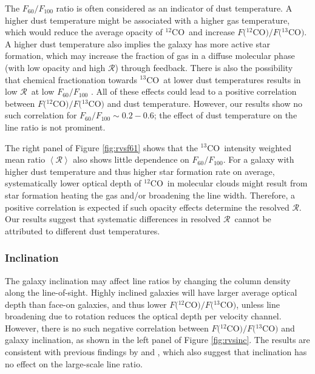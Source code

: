 \documentclass{emulateapj}
\def\ttco{\mbox{$^{13}$CO}}
\def\twco{\mbox{$^{12}$CO}}
\def\rtt{$\mathcal{R}$}
\begin{document}
The $F_{60}/F_{100}$ ratio is often considered as an indicator of
dust temperature. A higher dust temperature might be associated 
with a higher gas temperature, which would reduce the average opacity of \twco \ and increase  $F($\twco$)/F($\ttco$)$.  
A higher dust temperature also implies the galaxy has more active star formation, which may increase the fraction 
of gas in a diffuse molecular phase 
(with low opacity and high \rtt) through feedback. 
There is also the possibility that chemical fractionation
towards \ttco \ at lower dust temperatures results in
low \rtt \ at low $F_{60}/F_{100}$ \citep{Crocker2012}. 
All of these effects could lead to a positive correlation between  
$F($\twco$)/F($\ttco$)$ and dust temperature.  
However, our results show no such correlation for  $F_{60}/F_{100} \sim 0.2 - 0.6$; 
the effect of dust temperature on the line ratio is not prominent.  

The right panel of Figure \ref{fig:rvsf61} shows that 
the \ttco \ intensity weighted mean ratio 
$\left<\mathcal{R}\right>$ also shows little dependence on $F_{60}/F_{100}$.  
For a galaxy with higher dust temperature and thus higher star formation rate on average, 
systematically lower optical depth of \twco \ in molecular clouds might result from 
star formation heating the gas and/or broadening the line width. 
Therefore, a positive correlation is expected if such opacity effects 
determine the resolved \rtt. 
Our results suggest that systematic differences in resolved \rtt \ cannot be attributed to different dust temperatures.  


\subsubsection{Inclination}

\begin{figure*}
\caption{
\textit{Left}: Flux ratio $F($\twco$)/F($\ttco$)$ 
as a function of galaxy inclination. 
The vertical error bars 
show the uncertainty in the flux ratio.
\textit{Right}: \ttco \ intensity weighted mean ratio 
$\left<\mathcal{R}\right>$ as a function of 
galaxy inclination. The vertical error bars 
show the intensity weighted standard deviation of \rtt.
}
\label{fig:rvsinc}
\end{figure*}

The galaxy inclination may affect line ratios by changing the column density along the line-of-sight. 
Highly inclined galaxies will have larger average optical depth than face-on galaxies, 
and thus lower $F($\twco$)/F($\ttco$)$, 
unless line broadening due to rotation reduces the optical depth per velocity channel. 
However, there is no such negative  correlation between 
$F($\twco$)/F($\ttco$)$ and galaxy inclination, as shown in the left panel of Figure \ref{fig:rvsinc}. 
The results are consistent with previous findings by  \citet{Y&S1986} and \citet{S&I1991}, 
which also suggest   that inclination has no effect on the large-scale line ratio. 
\end{document}
